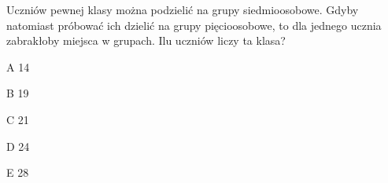 \begin{tresc}
Uczniów pewnej klasy można podzielić na grupy siedmioosobowe. Gdyby natomiast próbować ich dzielić na grupy pięcioosobowe, to dla jednego ucznia zabrakłoby miejsca w grupach. Ilu uczniów liczy ta klasa?
\end{tresc}
\begin{wariant}{A} 14 \end{wariant}
\begin{wariant}{B} 19 \end{wariant}
\begin{wariant}{C} 21 \end{wariant}
\begin{wariant}{D} 24 \end{wariant}
\begin{wariant}{E} 28 \end{wariant}
